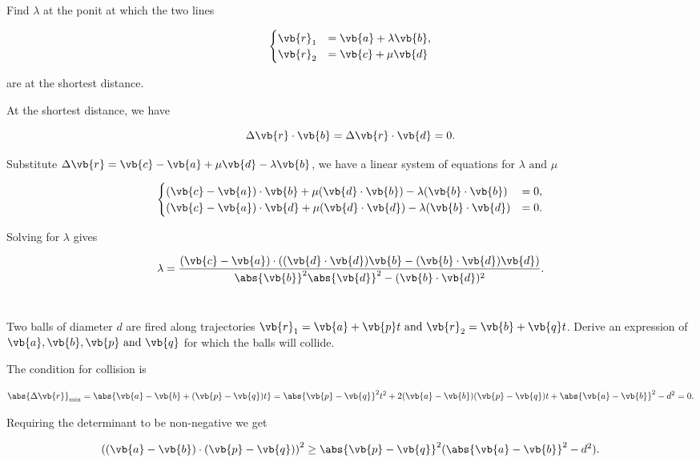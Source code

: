 \documentclass[a4paper,12pt]{report}
\begin{document}
{Find \(\lambda \) at the ponit at which the two lines

\begin{equation}
    \begin{cases}
        \vb{r} _{1} &= \vb{a} + \lambda \vb{b},\\
        \vb{r} _{2} &= \vb{c} + \mu \vb{d}
    \end{cases}
\end{equation}

are at the shortest distance.
}
{At the shortest distance, we have 

\begin{equation}
    \Delta \vb{r} \cdot \vb{b} = \Delta \vb{r} \cdot \vb{d} = 0.
\end{equation}

Substitute \(\Delta \vb{r} = \vb{c} -\vb{a} +\mu \vb{d} -\lambda \vb{b} \), we have a linear system of equations for \(\lambda \text { and } \mu \)

\begin{equation}
    \begin{cases}
        (\vb{c} -\vb{a} ) \cdot \vb{b} + \mu (\vb{d} \cdot \vb{b} ) - \lambda (\vb{b} \cdot \vb{b} ) &= 0,\\
        (\vb{c} -\vb{a} ) \cdot \vb{d} + \mu (\vb{d} \cdot \vb{d} ) - \lambda (\vb{b} \cdot \vb{d} ) &= 0.
    \end{cases}
\end{equation}

Solving for \(\lambda \) gives 

\begin{equation}
    \lambda = \frac{(\vb{c} -\vb{a} ) \cdot \left( (\vb{d} \cdot \vb{d} )\vb{b} -(\vb{b} \cdot \vb{d} )\vb{d}  \right)}{\abs{\vb{b} }^2 \abs{\vb{d} }^2 - (\vb{b} \cdot \vb{d} )^2  }.
\end{equation}
~
} 

{Two balls of diameter \(d\) are fired along trajectories \(\vb{r} _{1} = \vb{a} + \vb{p} t \text { and } \vb{r} _{2} = \vb{b} + \vb{q} t \). Derive an expression of \(\vb{a} , \vb{b} , \vb{p} \text { and } \vb{q} \) for which the balls will collide.}
{The condition for collision is

\begin{equation}
    \abs{\Delta \vb{r}} _{\text{min} } = \abs{\vb{a} -\vb{b} + (\vb{p} -\vb{q} )t} = \abs{\vb{p} -\vb{q} }^2t^2+2(\vb{a} -\vb{b} )(\vb{p} -\vb{q} )t+\abs{\vb{a} -\vb{b} }^2-d^2=0.   
\end{equation}

Requiring the determinant to be non-negative we get 

\begin{equation}
    \left( (\vb{a} -\vb{b} )\cdot (\vb{p} -\vb{q} ) \right)^2 \ge \abs{\vb{p} -\vb{q} }^2(\abs{\vb{a} -\vb{b} }^2-d^2 ). 
\end{equation}
~
} 
\end{document}
